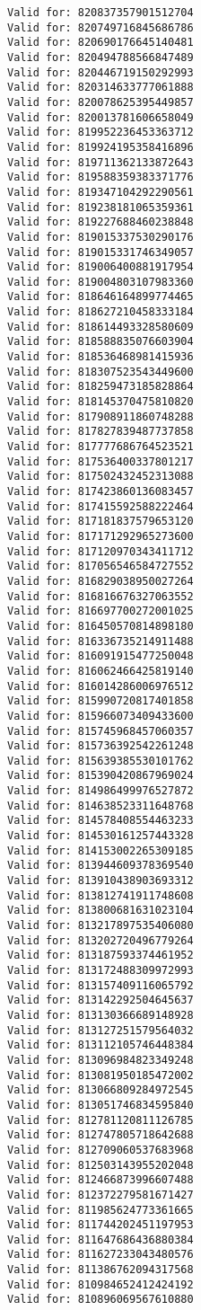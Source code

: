 \documentclass[11pt]{article}
\begin{document}
\begin{Verbatim}[commandchars=\\\{\}]
Valid for: 820837357901512704
Valid for: 820749716845686786
Valid for: 820690176645140481
Valid for: 820494788566847489
Valid for: 820446719150292993
Valid for: 820314633777061888
Valid for: 820078625395449857
Valid for: 820013781606658049
Valid for: 819952236453363712
Valid for: 819924195358416896
Valid for: 819711362133872643
Valid for: 819588359383371776
Valid for: 819347104292290561
Valid for: 819238181065359361
Valid for: 819227688460238848
Valid for: 819015337530290176
Valid for: 819015331746349057
Valid for: 819006400881917954
Valid for: 819004803107983360
Valid for: 818646164899774465
Valid for: 818627210458333184
Valid for: 818614493328580609
Valid for: 818588835076603904
Valid for: 818536468981415936
Valid for: 818307523543449600
Valid for: 818259473185828864
Valid for: 818145370475810820
Valid for: 817908911860748288
Valid for: 817827839487737858
Valid for: 817777686764523521
Valid for: 817536400337801217
Valid for: 817502432452313088
Valid for: 817423860136083457
Valid for: 817415592588222464
Valid for: 817181837579653120
Valid for: 817171292965273600
Valid for: 817120970343411712
Valid for: 817056546584727552
Valid for: 816829038950027264
Valid for: 816816676327063552
Valid for: 816697700272001025
Valid for: 816450570814898180
Valid for: 816336735214911488
Valid for: 816091915477250048
Valid for: 816062466425819140
Valid for: 816014286006976512
Valid for: 815990720817401858
Valid for: 815966073409433600
Valid for: 815745968457060357
Valid for: 815736392542261248
Valid for: 815639385530101762
Valid for: 815390420867969024
Valid for: 814986499976527872
Valid for: 814638523311648768
Valid for: 814578408554463233
Valid for: 814530161257443328
Valid for: 814153002265309185
Valid for: 813944609378369540
Valid for: 813910438903693312
Valid for: 813812741911748608
Valid for: 813800681631023104
Valid for: 813217897535406080
Valid for: 813202720496779264
Valid for: 813187593374461952
Valid for: 813172488309972993
Valid for: 813157409116065792
Valid for: 813142292504645637
Valid for: 813130366689148928
Valid for: 813127251579564032
Valid for: 813112105746448384
Valid for: 813096984823349248
Valid for: 813081950185472002
Valid for: 813066809284972545
Valid for: 813051746834595840
Valid for: 812781120811126785
Valid for: 812747805718642688
Valid for: 812709060537683968
Valid for: 812503143955202048
Valid for: 812466873996607488
Valid for: 812372279581671427
Valid for: 811985624773361665
Valid for: 811744202451197953
Valid for: 811647686436880384
Valid for: 811627233043480576
Valid for: 811386762094317568
Valid for: 810984652412424192
Valid for: 810896069567610880

\end{Verbatim}
\end{document}
